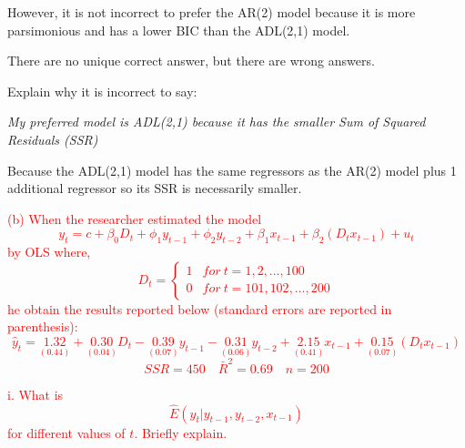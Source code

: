 \documentclass[12pt]{report}
\begin{document}
\noindent However, it is not incorrect to prefer the AR(2) model because it is more parsimonious and has a lower BIC than the ADL(2,1) model.

\noindent There are no unique correct answer, but there are wrong answers.

\noindent Explain why it is incorrect to say: \vspace{-\baselineskip} \begin{center}
	\textit{My preferred model is ADL(2,1) because it has the smaller Sum of Squared Residuals (SSR)}
\end{center}\vspace{-\baselineskip}  \noindent Because the ADL(2,1) model has the same regressors as the AR(2) model plus 1 additional regressor so its SSR is necessarily smaller.

\noindent \textcolor{red}{(b) When the researcher estimated the model $$y_t = c + \beta_0D_t + \phi_1y_{t-1} + \phi_2y_{t-2} + \beta_1x_{t-1} + \beta_2(D_tx_{t-1}) + u_t$$ by OLS where, \begin{equation*}
	D_t = \begin{cases}
	1 & for\ t=1,2,\dots,100 \\
	0 & for\ t=101,102,\dots,200
	\end{cases}
\end{equation*} he obtain the results reported below (standard errors are reported in parenthesis): $$\hat{y}_t = \underset{(0.44)}{1.32} + \underset{(0.04)}{0.30}D_t - \underset{(0.07)}{0.39}y_{t-1} - \underset{(0.06)}{0.31}y_{t-2} + \underset{(0.41)}{2.15}x_{t-1} + \underset{(0.07)}{0.15}(D_tx_{t-1})$$ $$SSR = 450 \quad \bar{R}^2 = 0.69 \quad n=200$$}

\noindent \textcolor{red}{i. What is $$\hat{E}(y_t|y_{t-1}, y_{t-2}, x_{t-1})$$ for different values of $t$. Briefly explain.}
\end{document}
